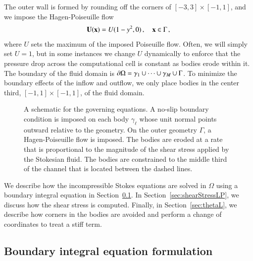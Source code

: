\documentclass[preprint, 10pt]{elsarticle}
\begin{document}
The outer wall is formed by rounding off the corners of $[-3,3] \times [-1,1]$, and we impose the Hagen-Poiseuille flow
\begin{align}
  {\mathbf{U}}({\mathbf{x}}) = U (1-y^2,0)\, , \quad {\mathbf{x}} \in \Gamma\, ,
\end{align}
where $U$ sets the maximum of the imposed Poiseuille flow. Often, we will simply set $U=1$, but in some instances we change $U$ dynamically to enforce that the pressure drop across the computational cell is constant as bodies erode within it.  The boundary of the fluid domain is ${\partial}\Omega = \gamma_1 \cup \cdots \cup \gamma_M \cup \Gamma$.  To minimize the boundary effects of the inflow and outflow, we only place bodies in the center third, $[-1,1] \times [-1,1]$, of the fluid domain.

\begin{figure}[htpb]
  \centering
  
  \caption{\label{fig:schematic} A schematic for the governing equations.  A no-slip boundary condition is imposed on each body $\gamma_\ell$ whose unit normal points outward relative to the geometry.  On the outer geometry $\Gamma$, a Hagen-Poiseuille flow is imposed.  The bodies are eroded at a rate that is proportional to the magnitude of the shear stress applied by the Stokesian fluid.  The bodies are constrained to the middle third of the channel that is located between the dashed lines.}
\end{figure}

We describe how the incompressible Stokes equations are solved in $\Omega$ using a boundary integral equation in Section~\ref{sec:bies}.  In Section~\ref{sec:shearStressLP}, we discuss how the shear stress is computed.  Finally, in Section~\ref{sec:thetaL}, we describe how corners in the bodies are avoided and perform a change of coordinates to treat a stiff term.


\subsection{Boundary integral equation formulation} 
\label{sec:bies}
\end{document}
